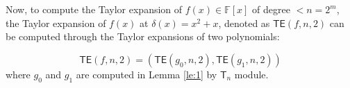 



Now, to compute the Taylor expansion of $f(x) \in \mathbb{F}[x]$ of degree $<n = 2^m$, the Taylor expansion of $f(x)$ at $\delta(x)=x^2+x$, denoted as $\mathsf{TE}(f, n, 2)$ can be computed through the Taylor expansions of two polynomials:

\begin{equation}\label{eq:T2}
	\mathsf{TE}(f, n, 2) = (\mathsf{TE}(g_0, n, 2), \mathsf{TE}(g_1, n, 2)) 
\end{equation}
where $g_0$ and $g_1$ are computed in Lemma \ref{le:1} by $\mathsf{T}_n$ module. 

	
	

